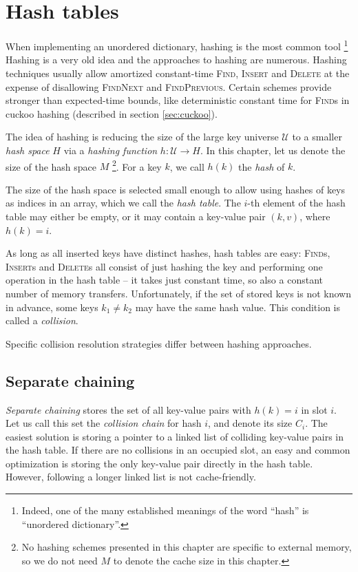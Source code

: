 \chapter{Hash tables}
\label{chapter:hashing}
When implementing an unordered dictionary, hashing is the most common tool
\footnote{Indeed, one of the many established meanings of the word ``hash''
	is ``unordered dictionary''.}
Hashing is a very old idea and the approaches to hashing are numerous. Hashing
techniques usually allow amortized constant-time \textsc{Find}, \textsc{Insert}
and \textsc{Delete} at the expense of disallowing \textsc{FindNext} and
\textsc{FindPrevious}. Certain schemes provide stronger than expected-time
bounds, like deterministic constant time for \textsc{Find}s in cuckoo hashing
(described in section \ref{sec:cuckoo}).

The idea of hashing is reducing the size of the large key universe
$\mathcal{U}$ to a smaller \emph{hash space} $H$ via a \emph{hashing function}
$h\mathop{:}\mathcal{U}\rightarrow H$.
In this chapter, let us denote the size of the hash space $M$
\footnote{%
	No hashing schemes presented in this chapter are specific to external
	memory, so we do not need $M$ to denote the cache size in this chapter.
}.
For a key $k$, we call $h(k)$ the \emph{hash} of $k$.

The size of the hash space is selected small enough to allow using hashes
of keys as indices in an array, which we call the \emph{hash table}.
The $i$-th element of the hash table may either be empty, or it may contain
a key-value pair $(k,v)$, where $h(k)=i$.


As long as all inserted keys have distinct hashes, hash tables are easy:
\textsc{Find}s, \textsc{Insert}s and \textsc{Delete}s all consist of just
hashing the key and performing one operation in the hash table -- it takes just
constant time, so also a constant number of memory transfers.
Unfortunately, if the set of stored keys is not known in advance,
some keys $k_1\neq k_2$ may have the same hash value.
This condition is called a \emph{collision}.

Specific collision resolution strategies differ between hashing approaches.

\section{Separate chaining}
\emph{Separate chaining} stores the set of all key-value pairs with
$h(k)=i$ in slot $i$. Let us call this set the \emph{collision chain} for hash
$i$, and denote its size $C_i$. The easiest solution is storing a pointer to
a linked list of colliding key-value pairs in the hash table. If there are no
collisions in an occupied slot, an easy and common optimization is storing
the only key-value pair directly in the hash table. However, following a longer
linked list is not cache-friendly.

